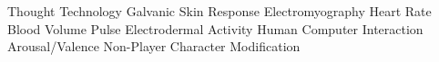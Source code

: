    {Thought Technology}
  {Galvanic Skin Response}
  {Electromyography}
   {Heart Rate}
  {Blood Volume Pulse}
  {Electrodermal Activity}
  {Human Computer Interaction}
   {Arousal/Valence}
  {Non-Player Character}
  {Modification}
